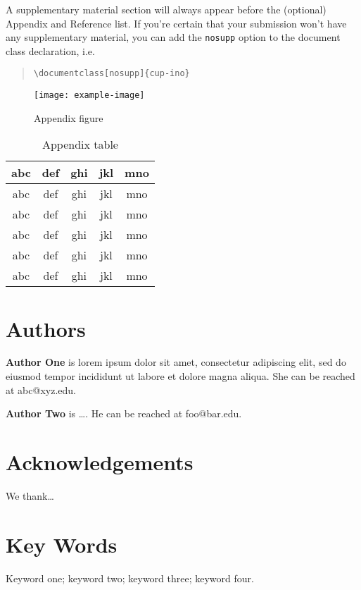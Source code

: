 \documentclass{cup-ino}
\begin{document}
\blinddocument

A supplementary material section will always appear before the (optional) Appendix and Reference list. If you're certain that your submission won't have any supplementary material, you can add the \texttt{nosupp} option to the document class declaration, i.e. 
\begin{quote}
\verb|\documentclass[nosupp]{cup-ino}|    
\end{quote}

\appendix

\begin{figure}[hbt!]
    \centering
    \texttt{[image: example-image]}
    \caption{Appendix figure}
    \label{app:fig}
\end{figure}

\begin{table}[hbt!]
    \caption{Appendix table}
    \label{app:tab1}
\begin{tabular}{c c c c c}
\toprule
     abc & def & ghi & jkl & mno \\
\midrule
     abc & def & ghi & jkl & mno \\
     abc & def & ghi & jkl & mno \\
     abc & def & ghi & jkl & mno \\
     abc & def & ghi & jkl & mno \\
     abc & def & ghi & jkl & mno \\
\bottomrule
\end{tabular}
\end{table}


\printbibliography

\section*{Authors}
\begin{authorbio}
\textbf{Author One} is lorem ipsum dolor sit amet, consectetur adipiscing elit, sed do eiusmod tempor incididunt ut labore et dolore magna aliqua. She can be reached at abc@xyz.edu.

\textbf{Author Two} is \ldots. He can be reached at foo@bar.edu.
\end{authorbio}

\section*{Acknowledgements}
We thank\ldots

\section*{Key Words}
Keyword one; keyword two; keyword three; keyword four.
\end{document}
